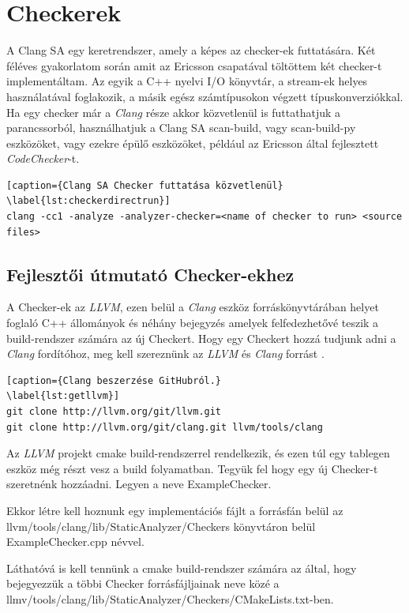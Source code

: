 \documentclass[a4paper,12pt]{report}
\begin{document}
\chapter{Checkerek}
A Clang SA egy keretrendszer, amely a képes az checker-ek futtatására. Két féléves gyakorlatom során amit az Ericsson csapatával töltöttem két checker-t implementáltam. Az egyik a C++ nyelvi I/O könyvtár, a stream-ek helyes használatával foglakozik, a másik egész számtípusokon végzett típuskonverziókkal.
Ha egy checker már a \emph{Clang} része akkor közvetlenül is futtathatjuk a parancssorból, használhatjuk a Clang SA scan-build, vagy scan-build-py eszközöket, vagy ezekre épülő eszközöket, például az Ericsson által fejlesztett \emph{CodeChecker}-t.

\begin{lstlisting}[caption={Clang SA Checker futtatása közvetlenül}
\label{lst:checkerdirectrun}]
clang -cc1 -analyze -analyzer-checker=<name of checker to run> <source files>
\end{lstlisting}

\section{Fejlesztői útmutató Checker-ekhez}
A Checker-ek az \emph{LLVM}, ezen belül a \emph{Clang} eszköz forráskönyvtárában helyet foglaló C++ állományok és néhány bejegyzés amelyek felfedezhetővé teszik a build-rendszer számára az új Checkert. Hogy egy Checkert hozzá tudjunk adni a \emph{Clang} fordítóhoz, meg kell szereznünk az \emph{LLVM} és \emph{Clang} forrást \cite{getllvmpage}.

\begin{lstlisting}[caption={Clang beszerzése GitHubról.}
\label{lst:getllvm}]
git clone http://llvm.org/git/llvm.git
git clone http://llvm.org/git/clang.git llvm/tools/clang
\end{lstlisting}

Az \emph{LLVM} projekt cmake build-rendszerrel rendelkezik, és ezen túl egy tablegen eszköz még részt vesz a build folyamatban. Tegyük fel hogy egy új Checker-t szeretnénk hozzáadni. Legyen a neve ExampleChecker.

Ekkor létre kell hoznunk egy implementációs fájlt a forrásfán belül az llvm/tools/clang/lib/StaticAnalyzer/Checkers könyvtáron belül ExampleChecker.cpp névvel.

Láthatóvá is kell tennünk a cmake build-rendszer számára az által, hogy bejegyezzük a többi Checker forrásfájljainak neve közé a llmv/tools/clang/lib/StaticAnalyzer/Checkers/CMakeLists.txt-ben.
\end{document}

